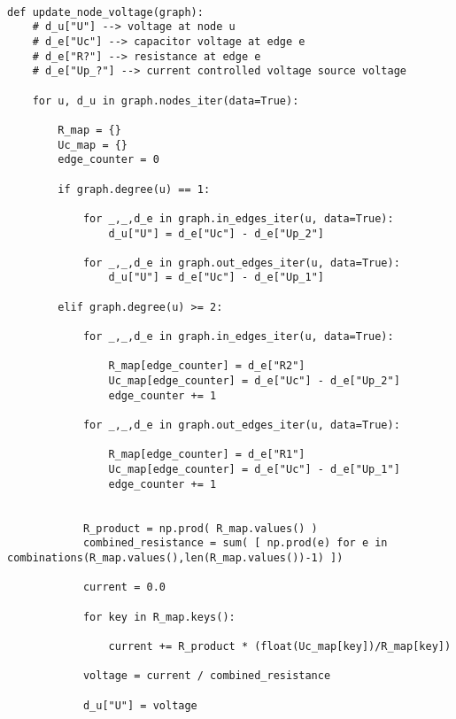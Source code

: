 \begin{codesnippet}
\begin{verbatim}

def update_node_voltage(graph):
	# d_u["U"] --> voltage at node u
	# d_e["Uc"] --> capacitor voltage at edge e
	# d_e["R?"] --> resistance at edge e
	# d_e["Up_?"] --> current controlled voltage source voltage

	for u, d_u in graph.nodes_iter(data=True):
			
		R_map = {}
		Uc_map = {}
		edge_counter = 0

		if graph.degree(u) == 1:

			for _,_,d_e in graph.in_edges_iter(u, data=True):
				d_u["U"] = d_e["Uc"] - d_e["Up_2"]

			for _,_,d_e in graph.out_edges_iter(u, data=True):
				d_u["U"] = d_e["Uc"] - d_e["Up_1"]

		elif graph.degree(u) >= 2:

			for _,_,d_e in graph.in_edges_iter(u, data=True):

				R_map[edge_counter] = d_e["R2"]
				Uc_map[edge_counter] = d_e["Uc"] - d_e["Up_2"]
				edge_counter += 1

			for _,_,d_e in graph.out_edges_iter(u, data=True):

				R_map[edge_counter] = d_e["R1"]
				Uc_map[edge_counter] = d_e["Uc"] - d_e["Up_1"]
				edge_counter += 1


			R_product = np.prod( R_map.values() )
			combined_resistance = sum( [ np.prod(e) for e in combinations(R_map.values(),len(R_map.values())-1) ])

			current = 0.0

			for key in R_map.keys():

				current += R_product * (float(Uc_map[key])/R_map[key])

			voltage = current / combined_resistance
		
			d_u["U"] = voltage

\end{verbatim}
\label{code:node_voltage}
\end{codesnippet}

